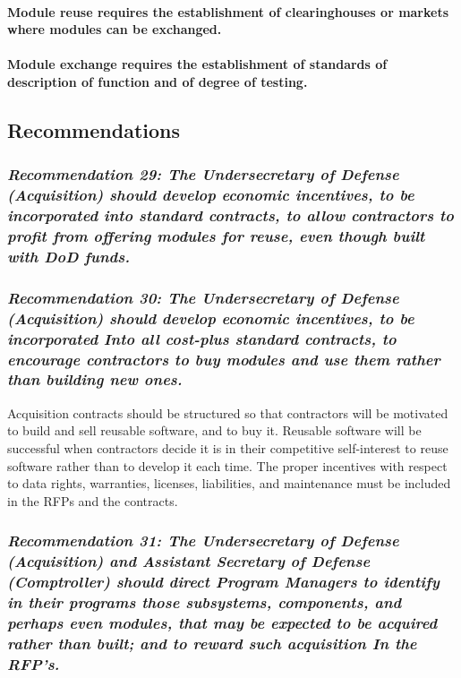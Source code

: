 \documentclass[12pt]{article}
\begin{document}
\paragraph{Module reuse requires the establishment of clearinghouses or markets where
modules can be exchanged.}

\paragraph{Module exchange requires the establishment of standards of description of
function and of degree of testing.}

\subsection*{Recommendations}

\subsubsection*{\textit{Recommendation 29: The Undersecretary of Defense
(Acquisition) should develop economic incentives, to be incorporated into
standard contracts, to allow contractors to profit from offering modules for
reuse, even though built with DoD funds.}}

\subsubsection*{\textit{Recommendation 30: The Undersecretary of Defense
(Acquisition) should develop economic incentives, to be incorporated Into all
cost-plus standard contracts, to encourage contractors to buy modules and use
them rather than building new ones.}}

Acquisition contracts should be structured so that contractors will be
motivated to build and sell reusable software, and to buy it. Reusable software
will be successful when contractors decide it is in their competitive
self-interest to reuse software rather than to develop it each time. The proper
incentives with respect to data rights, warranties, licenses, liabilities, and
maintenance must be included in the RFPs and the contracts.

\subsubsection*{\textit{Recommendation 31: The Undersecretary of Defense
(Acquisition) and Assistant Secretary of Defense (Comptroller) should direct
Program Managers to identify in their programs those subsystems, components,
and perhaps even modules, that may be expected to be acquired rather than
built; and to reward such acquisition In the RFP's.}}
\end{document}
